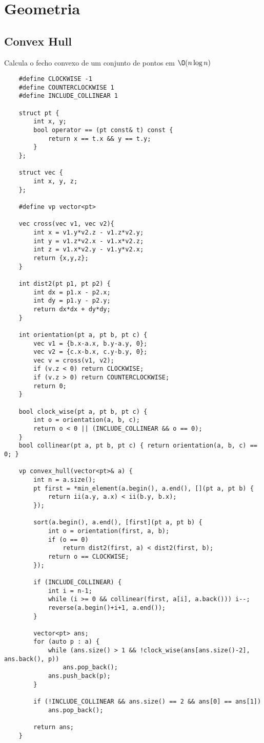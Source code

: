 \section{Geometria}

\subsection{Convex Hull}

Calcula o fecho convexo de um conjunto de pontos em $\O (n\log n)$

\begin{verbatim}
    #define CLOCKWISE -1
    #define COUNTERCLOCKWISE 1
    #define INCLUDE_COLLINEAR 1
    
    struct pt {
        int x, y;
        bool operator == (pt const& t) const {
            return x == t.x && y == t.y;
        }
    };
    
    struct vec {
        int x, y, z;
    };
    
    #define vp vector<pt>
    
    vec cross(vec v1, vec v2){
        int x = v1.y*v2.z - v1.z*v2.y;
        int y = v1.z*v2.x - v1.x*v2.z;
        int z = v1.x*v2.y - v1.y*v2.x;
        return {x,y,z};
    }
    
    int dist2(pt p1, pt p2) {
        int dx = p1.x - p2.x;
        int dy = p1.y - p2.y;
        return dx*dx + dy*dy;
    }
    
    int orientation(pt a, pt b, pt c) {
        vec v1 = {b.x-a.x, b.y-a.y, 0};
        vec v2 = {c.x-b.x, c.y-b.y, 0};
        vec v = cross(v1, v2);
        if (v.z < 0) return CLOCKWISE;
        if (v.z > 0) return COUNTERCLOCKWISE;
        return 0;
    }
    
    bool clock_wise(pt a, pt b, pt c) {
        int o = orientation(a, b, c);
        return o < 0 || (INCLUDE_COLLINEAR && o == 0);
    }
    bool collinear(pt a, pt b, pt c) { return orientation(a, b, c) == 0; }
    
    vp convex_hull(vector<pt>& a) {
        int n = a.size();
        pt first = *min_element(a.begin(), a.end(), [](pt a, pt b) {
            return ii(a.y, a.x) < ii(b.y, b.x);
        });
    
        sort(a.begin(), a.end(), [first](pt a, pt b) {
            int o = orientation(first, a, b);
            if (o == 0)
                return dist2(first, a) < dist2(first, b);
            return o == CLOCKWISE;
        });
        
        if (INCLUDE_COLLINEAR) {
            int i = n-1;
            while (i >= 0 && collinear(first, a[i], a.back())) i--;
            reverse(a.begin()+i+1, a.end());
        }
    
        vector<pt> ans;
        for (auto p : a) {
            while (ans.size() > 1 && !clock_wise(ans[ans.size()-2], ans.back(), p))
                ans.pop_back();
            ans.push_back(p);
        }
    
        if (!INCLUDE_COLLINEAR && ans.size() == 2 && ans[0] == ans[1])
            ans.pop_back();
    
        return ans;
    }
    
    
\end{verbatim}

